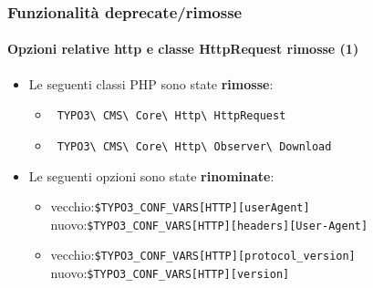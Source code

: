 \begin{frame}[fragile]
	\frametitle{Funzionalità deprecate/rimosse}
	\framesubtitle{Opzioni relative http e classe HttpRequest rimosse (1)}

	\begin{itemize}

		\item Le seguenti classi PHP sono state \textbf{rimosse}:

			\begin{itemize}
				\item \small\texttt{
					TYPO3\textbackslash
					CMS\textbackslash
					Core\textbackslash
					Http\textbackslash
					HttpRequest}\normalsize
				\item \small\texttt{
					TYPO3\textbackslash
					CMS\textbackslash
					Core\textbackslash
					Http\textbackslash
					Observer\textbackslash
					Download}\normalsize
			\end{itemize}

		\item Le seguenti opzioni sono state \textbf{rinominate}:

			\begin{itemize}

				\item
					\small
						vecchio:\tabto{1.5cm}\texttt{\$TYPO3\_CONF\_VARS[HTTP][userAgent]}\newline
						nuovo:\tabto{1.5cm}\texttt{\$TYPO3\_CONF\_VARS[HTTP][headers][User-Agent]}

				\item
					\small
						vecchio:\tabto{1.5cm}\texttt{\$TYPO3\_CONF\_VARS[HTTP][protocol\_version]}\newline
						nuovo:\tabto{1.5cm}\texttt{\$TYPO3\_CONF\_VARS[HTTP][version]}

			\end{itemize}

	\end{itemize}

\end{frame}


